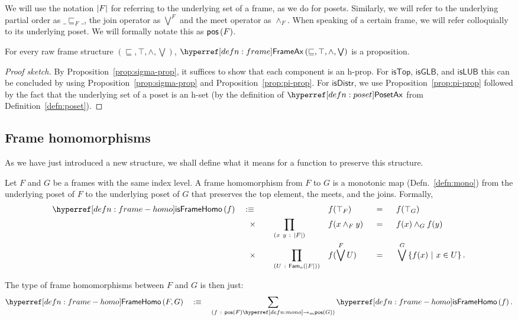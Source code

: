 We will use the notation $\left| F \right|$ for referring to the underlying set of a frame, as we
do for posets. Similarly, we will refer to the underlying partial order as $\_\sqsubseteq_F\_$, the
join operator as $\bigvee^F$ and the meet operator as $\wedge_F$. When speaking of a certain frame,
we will refer colloquially to its underlying poset. We will formally notate this as
$\mathsf{pos}\left(F\right)$.

\begin{prop}
  For every raw frame structure $(\sqsubseteq, \top, \wedge, \bigvee)$, $\frameax{\sqsubseteq, \top, \wedge, \bigvee}$ is a proposition.
\end{prop}
\begin{proof}[Proof sketch]
  By Proposition~\ref{prop:sigma-prop}, it suffices to show that each component is an
  h-prop. For $\mathsf{isTop}$, $\mathsf{isGLB}$, and $\mathsf{isLUB}$ this can be
  concluded by using Proposition~\ref{prop:sigma-prop} and Proposition~\ref{prop:pi-prop}.
  For $\mathsf{isDistr}$, we use Proposition~\ref{prop:pi-prop} followed by the fact that
  the underlying set of a poset is an h-set (by the definition of $\posetaxnm{}$ from
  Definition~\ref{defn:poset}).
\end{proof}

\subsection{Frame homomorphisms}

As we have just introduced a new structure, we shall define what it means for a function
to preserve this structure.

\begin{defn}\label{defn:frame-homo}
  Let $F$ and $G$ be a frames with the same index level. A frame homomorphism from $F$ to
  $G$ is a monotonic map (Defn.~\ref{defn:mono}) from the underlying poset of $F$ to the
  underlying poset of $G$ that preserves the top element, the meets, and the joins.
  Formally,
  \begin{alignat*}{5}
    \isframehomo{f} \quad&\is\quad &&  &&f(\top_F) &&\idnm{} &&f(\top_G) \\
                     &\hspace{0.75em}\times\quad &&\pity{x~y}{\abs{F}}{&&f(x \wedge_F y) &&\idnm{} &&f(x) \wedge_G f(y)} \\
                     &\hspace{0.75em}\times\quad &&\pity{U}{\sub{o}{\abs{F}}}{&&f(\bigvee^F U) &&\idnm{} &&\bigvee^G \setof{ f(x) ~|~ x \in U }}.
  \end{alignat*}

  The type of frame homomorphisms between $F$ and $G$ is then just:
  \begin{equation*}
    \framehomo{F}{G} \quad\is\quad \sigmaty{f}{\mono{\posof{F}}{\posof{G}}}{\isframehomo{f}}.
  \end{equation*}
\end{defn}

